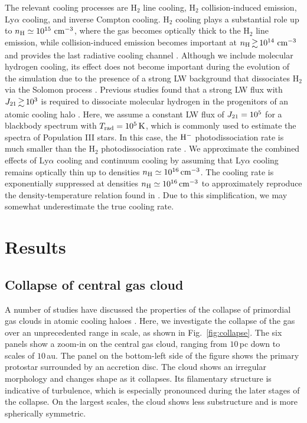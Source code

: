 \documentclass[useAMS,usenatbib]{mnras}
\newcommand{\cmmm}{\text{cm}^{-3}}
\newcommand{\HH}{\text{H}_2}          %
\newcommand{\HM}{{\rm H}^{-}}     %
\newcommand{\nh}{n_{\rm H}}
\begin{document}
The relevant cooling processes are $\HH$ line cooling, $\HH$ collision-induced emission, Ly$\alpha$ cooling, and inverse Compton cooling. $\HH$ cooling plays a substantial role up to $\nh\simeq 10^{15}~\cmmm$, where the gas becomes optically thick to the $\HH$ line emission, while collision-induced emission becomes important at $\nh\ga 10^{14}~\cmmm$ and provides the last radiative cooling channel \citep{Omukai_1998, Ripamonti_2004}. Although we include molecular hydrogen cooling, its effect does not become important during the evolution of the simulation due to the presence of a strong LW background that dissociates $\HH$ via the Solomon process \citep{Abel_1997}. Previous studies found that a strong LW flux with $J_{\rm 21}\ga 10^3$ is required to dissociate molecular hydrogen in the progenitors of an atomic cooling halo \citep{Omukai_2001, Johnson_2007, Dijkstra_2008, Latif_2013b, Wolcott-Green_2011}. Here, we assume a constant LW flux of $J_{\rm 21}=10^5$ for a blackbody spectrum with $T_{\rm rad}=10^5\,{\rm K}$, which is commonly used to estimate the spectra of Population III stars. In this case, the $\HM$ photodissociation rate is much smaller than the $\HH$ photodissociation rate \citep{Sugimura_2014}. We approximate the combined effects of Ly$\alpha$ cooling and continuum cooling by assuming that Ly$\alpha$ cooling remains optically thin up to densities $\nh\simeq 10^{16}\,\cmmm$. The cooling rate is exponentially suppressed at densities $\nh\simeq 10^{16}\,\cmmm$ to approximately reproduce the density-temperature relation found in \citet{Omukai_2001}. Due to this simplification, we may somewhat underestimate the true cooling rate.

\section{Results}
\label{sec:results}

\subsection{Collapse of central gas cloud}
\label{subsec:collapse}
        
A number of studies have discussed the properties of the collapse of primordial gas clouds in atomic cooling haloes \citep[e.g.,][]{Bromm_2003, Regan_2009, Choi_2013, Latif_2013a, Inayoshi_2014, Regan_2014a}. Here, we investigate the collapse of the gas over an unprecedented range in scale, as shown in Fig.~\ref{fig:collapse}. The six panels show a zoom-in on the central gas cloud, ranging from $10\,$pc down to scales of $10\,$au. The panel on the bottom-left side of the figure shows the primary protostar surrounded by an accretion disc. The cloud shows an irregular morphology and changes shape as it collapses. Its filamentary structure is indicative of turbulence, which is especially pronounced during the later stages of the collapse. On the largest scales, the cloud shows less substructure and is more spherically symmetric.
        
\end{document}
